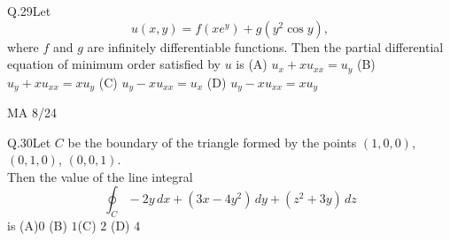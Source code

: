 \documentclass{article}
\begin{document}
																															    Q.29\quad Let
																															    \[
																															    u(x,y) = f(xe^y) + g(y^2 \cos y),
																															    \]
																															    where $f$ and $g$ are infinitely differentiable functions. Then the partial differential equation of minimum order satisfied by $u$ is
																															    \newline
																															    \noindent (A)  $u_x + x u_{xx} = u_y$ \hspace{6cm} (B)  $u_y + x u_{xx} = x u_y$
																															    \newline \noindent (C) $u_y - x u_{xx} = u_x$ \hspace{6cm}  (D) $u_y - x u_{xx} = x u_y$
																															    \vspace{20em}
																															    \begin{center}
																															        {MA 8/24}
																																\end{center}

																																\newpage
																																Q.30\quad Let $C$ be the boundary of the triangle formed by the points $(1,0,0)$, $(0,1,0)$, $(0,0,1)$.\\
																																Then the value of the line integral
																																\[
																																\oint_C -2y\,dx + (3x - 4y^2)\,dy + (z^2 + 3y)\,dz
																																\]
																																is
																																\newline \noindent (A)$0$ \hspace{2cm} (B) $1$\hspace{2cm}(C) $2$ \hspace{2cm} (D) $4$


																																\vspace{0.5cm}
\end{document}
